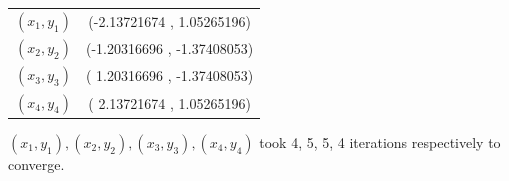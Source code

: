 \documentclass[12,a4paper]{article}
\begin{document}
    \begin{table}[H]
        \centering
        \begin{tabular}{|c|c|}
        \hline
            $(x_1,y_1)$ & (-2.13721674 , 1.05265196) \\
            $(x_2,y_2)$ & (-1.20316696 , -1.37408053) \\
            $(x_3,y_3)$ & ( 1.20316696 , -1.37408053) \\
            $(x_4,y_4)$ & ( 2.13721674 , 1.05265196) \\
        \hline
        \end{tabular}
    \end{table}
    
    $(x_1,y_1), (x_2,y_2), (x_3,y_3), (x_4,y_4)$ took 4, 5, 5, 4 iterations respectively to converge.
    
\end{document}
